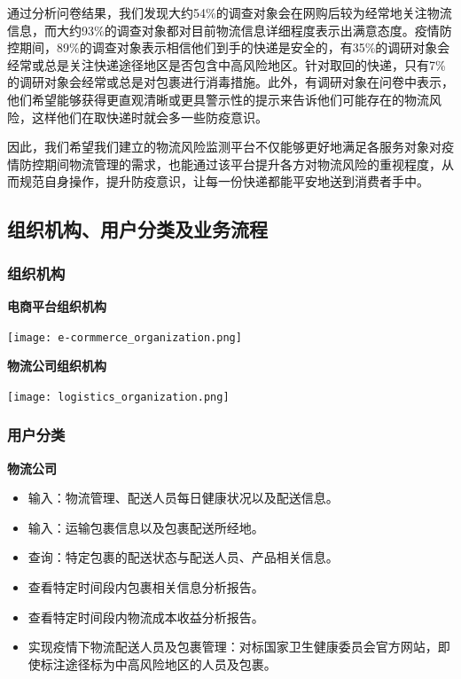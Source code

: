 \documentclass[12pt]{article}
\begin{document}
通过分析问卷结果，我们发现大约54\%的调查对象会在网购后较为经常地关注物流信息，而大约93\%的调查对象都对目前物流信息详细程度表示出满意态度。疫情防控期间，89\%的调查对象表示相信他们到手的快递是安全的，有35\%的调研对象会经常或总是关注快递途径地区是否包含中高风险地区。针对取回的快递，只有7\%的调研对象会经常或总是对包裹进行消毒措施。此外，有调研对象在问卷中表示，他们希望能够获得更直观清晰或更具警示性的提示来告诉他们可能存在的物流风险，这样他们在取快递时就会多一些防疫意识。

因此，我们希望我们建立的物流风险监测平台不仅能够更好地满足各服务对象对疫情防控期间物流管理的需求，也能通过该平台提升各方对物流风险的重视程度，从而规范自身操作，提升防疫意识，让每一份快递都能平安地送到消费者手中。

\newpage
\subsection{组织机构、用户分类及业务流程}

\subsubsection{组织机构}

\noindent \textbf{电商平台组织机构}
\begin{center}
	\texttt{[image: e-cormmerce\_organization.png]}
\end{center}

\noindent \textbf{物流公司组织机构}
\begin{center}
	\texttt{[image: logistics\_organization.png]}
\end{center}

\subsubsection{用户分类}

\noindent \textbf{物流公司}
\begin{itemize}
	\item 输入：物流管理、配送人员每日健康状况以及配送信息。
	\item 输入：运输包裹信息以及包裹配送所经地。
	\item 查询：特定包裹的配送状态与配送人员、产品相关信息。
	\item 查看特定时间段内包裹相关信息分析报告。
	\item 查看特定时间段内物流成本收益分析报告。
	\item 实现疫情下物流配送人员及包裹管理：对标国家卫生健康委员会官方网站，即使标注途径标为中高风险地区的人员及包裹。
\end{itemize}
\end{document}
